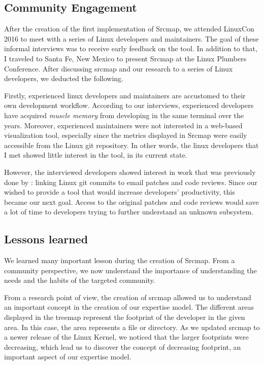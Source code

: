 \subsection{Community Engagement}

After the creation of the first implementation of Srcmap, we attended LinuxCon 2016 to meet with a series of Linux developers and maintainers. The goal of these informal interviews was to receive early feedback on the tool. In addition to that, I traveled to Santa Fe, New Mexico to present Srcmap at the Linux Plumbers Conference. After discussing srcmap and our research to a series of Linux developers, we deducted the following. 

Firstly, experienced linux developers and maintainers are accustomed to their own development workflow. According to our interviews, experienced developers have acquired \textit{muscle memory} from developing in the same terminal over the years. Moreover, experienced maintainers were not interested in a web-based visualization tool, especially since the metrics displayed in Srcmap were easily accessible from the Linux git repository. In other words, the linux developers that I met showed little interest in the tool, in its current state.

However, the interviewed developers showed interest in work that was previously done by \cite{jiang14}: linking Linux git commits to email patches and code reviews. Since our wished to provide a tool that would increase developers' productivity, this became our next goal. Access to the original patches and code reviews would save a lot of time to developers trying to further understand an unknown subsystem. 



\subsection{Lessons learned}
\label{sec:lessons_srcmap}

We learned many important lesson during the creation of Srcmap.  From a community perspective, we now understand the importance of understanding the needs and the habits of the targeted community. 


From a research point of view, the creation of srcmap allowed us to understand an important concept in the creation of our expertise model. The different areas displayed in the treemap represent the footprint of the developer in the given area. In this case, the area represents a file or directory. As we updated srcmap to a newer release of the Linux Kernel, we noticed that the larger footprints were decreasing, which lead us to discover the concept of decreasing footprint, an important aspect of our expertise model. 


